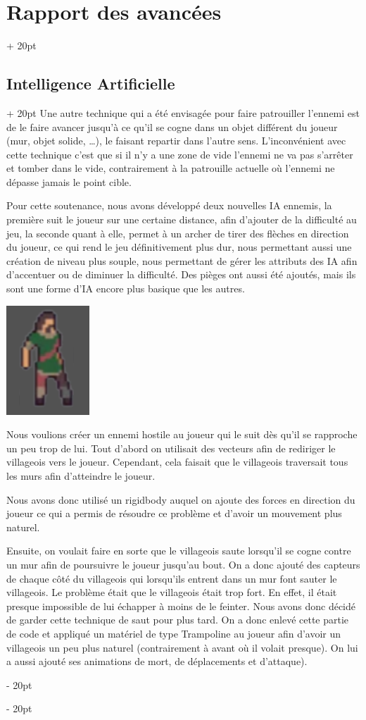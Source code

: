 \documentclass[a4paper, 12pt, twoside]{article}
\newcommand{\ind}[1][20pt]{\advance\leftskip + #1}
\newcommand{\deind}[1][20pt]{\advance\leftskip - #1}
\newenvironment{indt}[2][20pt]{#2 \par \ind[#1]}{\par \deind} %
\begin{document}
\begin{indt}{\section{Rapport des avancées}}
\begin{indt}{\subsection{Intelligence Artificielle}}
            Une autre technique qui a été envisagée pour faire patrouiller l'ennemi est de le faire avancer jusqu'à ce qu'il se cogne dans un objet différent du joueur (mur, objet solide, …), le faisant repartir dans l'autre sens. L'inconvénient avec cette technique c'est que si il n'y a une zone de vide l'ennemi ne va pas s'arrêter et tomber dans le vide, contrairement à la patrouille actuelle où l'ennemi ne dépasse jamais le point cible.

            Pour cette soutenance, nous avons développé deux nouvelles IA ennemis, la première suit le joueur sur une certaine distance, afin d'ajouter de la difficulté au jeu, la seconde quant à elle, permet à un archer de tirer des flèches en direction du joueur, ce qui rend le jeu définitivement plus dur, nous permettant aussi une création de niveau plus souple, nous permettant de gérer les attributs des IA afin d'accentuer ou de diminuer la difficulté. Des pièges ont aussi été ajoutés, mais ils sont une forme d'IA encore plus basique que les autres.

            \begin{center}
                \includegraphics[width=0.2\linewidth]{villageois.png}
            \end{center}

            Nous voulions créer un ennemi hostile au joueur qui le suit dès qu'il se rapproche un peu trop de lui. Tout d'abord on utilisait des vecteurs afin de rediriger le villageois vers le joueur. Cependant, cela faisait que le villageois traversait tous les murs afin d'atteindre le  joueur.

            Nous avons donc utilisé un rigidbody auquel on ajoute des forces en direction du joueur ce qui a permis de résoudre ce problème et d'avoir un mouvement plus naturel.

            Ensuite, on voulait faire en sorte que le villageois saute lorsqu'il se cogne contre un mur afin de poursuivre le joueur jusqu'au bout. On a donc ajouté des capteurs de chaque côté du villageois qui lorsqu'ils entrent dans un mur font sauter le villageois. Le problème était que le villageois était trop fort. En effet, il était presque impossible de lui échapper à moins de le feinter. Nous avons donc décidé de garder cette technique de saut pour plus tard. On a donc enlevé cette partie de code et appliqué un matériel de type Trampoline au joueur afin d'avoir un villageois un peu plus naturel (contrairement à avant où il volait presque). On lui a aussi ajouté ses animations de mort, de déplacements et d'attaque).


\end{indt}
\end{indt}
\end{document}
